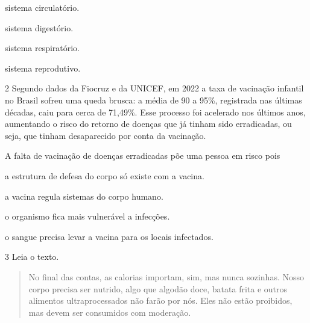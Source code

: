 \begin{minipage}{.5\textwidth}
\begin{escolha}
\item sistema circulatório.

\item sistema digestório.

\item sistema respiratório.

\item sistema reprodutivo.
\end{escolha}
\end{minipage}

\pagebreak
\num{2} Segundo dados da Fiocruz e da UNICEF, em 2022 a taxa de
vacinação infantil no Brasil sofreu uma queda brusca: a média de 90 a 95\%,
registrada nas últimas décadas, caiu para cerca de 71,49\%. Esse processo
foi acelerado nos últimos anos, aumentando o risco do retorno de doenças
que já tinham sido erradicadas, ou seja, que tinham desaparecido por conta
da vacinação. 

A falta de vacinação de doenças erradicadas põe uma pessoa em risco pois

\begin{escolha}
\item a estrutura de defesa do corpo só existe com a vacina.

\item a vacina regula sistemas do corpo humano.

\item o organismo fica mais vulnerável a infecções.

\item o sangue precisa levar a vacina para os locais infectados.
\end{escolha}


\num{3} Leia o texto.

\begin{quote}
No final das contas, as calorias importam, sim, mas nunca sozinhas.
Nosso corpo precisa ser nutrido, algo que algodão doce, batata frita e
outros alimentos ultraprocessados não farão por nós. Eles não estão
proibidos, mas devem ser consumidos com moderação.

\end{quote}

